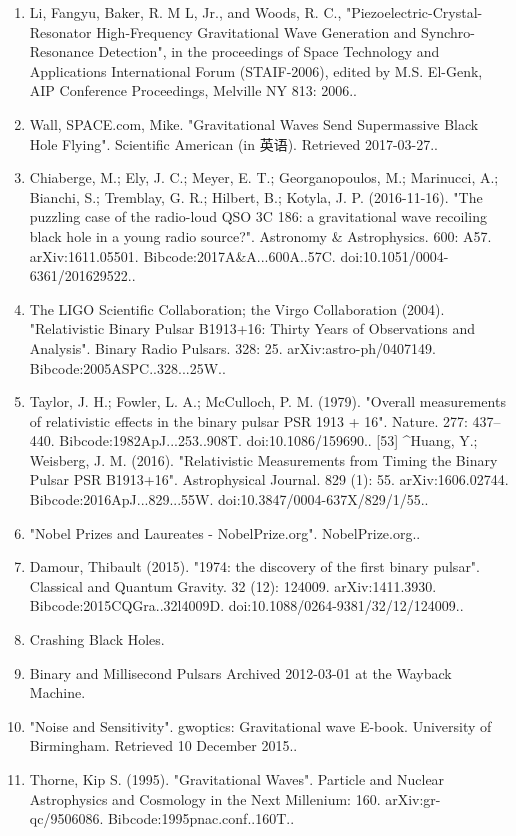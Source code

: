 \begin{enumerate}
\item Li, Fangyu, Baker, R. M L, Jr., and Woods, R. C., "Piezoelectric-Crystal-Resonator High-Frequency Gravitational Wave Generation and Synchro-Resonance Detection", in the proceedings of Space Technology and Applications International Forum (STAIF-2006), edited by M.S. El-Genk, AIP Conference Proceedings, Melville NY 813: 2006..
\item Wall, SPACE.com, Mike. "Gravitational Waves Send Supermassive Black Hole Flying". Scientific American (in 英语). Retrieved 2017-03-27..
\item Chiaberge, M.; Ely, J. C.; Meyer, E. T.; Georganopoulos, M.; Marinucci, A.; Bianchi, S.; Tremblay, G. R.; Hilbert, B.; Kotyla, J. P. (2016-11-16). "The puzzling case of the radio-loud QSO 3C 186: a gravitational wave recoiling black hole in a young radio source?". Astronomy & Astrophysics. 600: A57. arXiv:1611.05501. Bibcode:2017A&A...600A..57C. doi:10.1051/0004-6361/201629522..
\item The LIGO Scientific Collaboration; the Virgo Collaboration (2004). "Relativistic Binary Pulsar B1913+16: Thirty Years of Observations and Analysis". Binary Radio Pulsars. 328: 25. arXiv:astro-ph/0407149. Bibcode:2005ASPC..328...25W..
\item Taylor, J. H.; Fowler, L. A.; McCulloch, P. M. (1979). "Overall measurements of relativistic effects in the binary pulsar PSR 1913 + 16". Nature. 277: 437–440. Bibcode:1982ApJ...253..908T. doi:10.1086/159690..
[53]
^Huang, Y.; Weisberg, J. M. (2016). "Relativistic Measurements from Timing the Binary Pulsar PSR B1913+16". Astrophysical Journal. 829 (1): 55. arXiv:1606.02744. Bibcode:2016ApJ...829...55W. doi:10.3847/0004-637X/829/1/55..
\item "Nobel Prizes and Laureates - NobelPrize.org". NobelPrize.org..
\item Damour, Thibault (2015). "1974: the discovery of the first binary pulsar". Classical and Quantum Gravity. 32 (12): 124009. arXiv:1411.3930. Bibcode:2015CQGra..32l4009D. doi:10.1088/0264-9381/32/12/124009..
\item Crashing Black Holes.
\item Binary and Millisecond Pulsars Archived 2012-03-01 at the Wayback Machine.
\item "Noise and Sensitivity". gwoptics: Gravitational wave E-book. University of Birmingham. Retrieved 10 December 2015..
\item Thorne, Kip S. (1995). "Gravitational Waves". Particle and Nuclear Astrophysics and Cosmology in the Next Millenium: 160. arXiv:gr-qc/9506086. Bibcode:1995pnac.conf..160T..

\end{enumerate}
